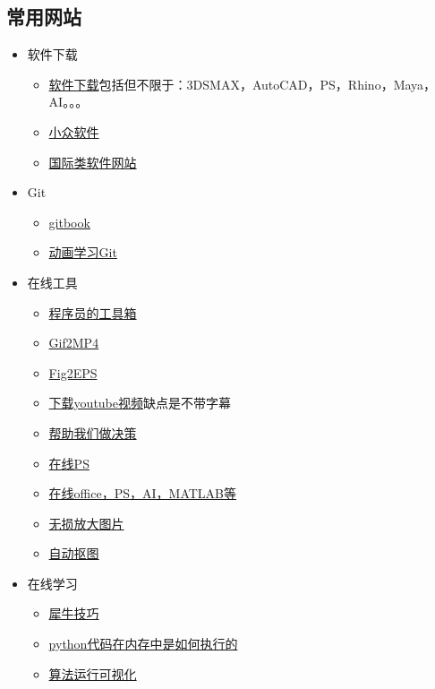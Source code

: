 \documentclass[UTF8]{ctexbook}
\begin{document}
\subsection{常用网站}
\begin{itemize}
	\item 软件下载
	      \begin{itemize}
		      \item \href{https://www.3d66.com/popsoft_26.html}{软件下载}\quad 包括但不限于：3DSMAX，AutoCAD，PS，Rhino，Maya，AI。。。
		      \item \href{https://www.appinn.com/category/windows/}{小众软件}
		      \item \href{https://filehippo.com/zh/}{国际类软件网站}
	      \end{itemize}
	\item Git
	      \begin{itemize}
		      \item \href{http://gitbook.liuhui998.com/index.html}{gitbook}
		      \item \href{https://learngitbranching.js.org/?demo}{动画学习Git}
	      \end{itemize}
	\item 在线工具
	      \begin{itemize}
		      \item \href{https://tool.lu}{程序员的工具箱}
		      \item \href{https://cloudconvert.com/gif-to-mp4}{Gif2MP4}
		      \item \href{https://cn.office-converter.com/FIG-to-EPS}{Fig2EPS}
		      \item \href{http://www.ytube.win}{下载youtube视频}\quad 缺点是不带字幕
		      \item \href{https://www.slant.co}{帮助我们做决策}
		      \item \href{https://www.photopea.com}{在线PS}
		      \item \href{https://uzer.me/u/signin}{在线office，PS，AI，MATLAB等}
		      \item \href{https://bigjpg.com}{无损放大图片}
		      \item \href{https://www.remove.bg}{自动抠图}
	      \end{itemize}
	\item 在线学习
	      \begin{itemize}
		      \item \href{http://www.xuexiniu.com/forum.php?mod=forumdisplay&fid=102&filter=typeid&typeid=1}{犀牛技巧}
		      \item \href{http://www.pythontutor.com}{python代码在内存中是如何执行的}
		      \item \href{https://algorithm-visualizer.org}{算法运行可视化}
	      \end{itemize}
\end{itemize}
\end{document}
